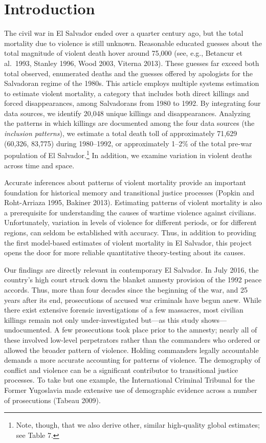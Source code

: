 \documentclass[11pt,]{article}
\let\rmarkdownfootnote\footnote%
\def\footnote{\protect\rmarkdownfootnote}
\begin{document}
\hypertarget{introduction}{%
\section{Introduction}\label{introduction}}

The civil war in El Salvador ended over a quarter century ago, but the
total mortality due to violence is still unknown. Reasonable educated
guesses about the total magnitude of violent death hover around 75,000
(see, e.g., Betancur et al.~1993, Stanley 1996, Wood 2003, Viterna
2013). These guesses far exceed both total observed, enumerated deaths
and the guesses offered by apologists for the Salvadoran regime of the
1980s. This article employs multiple systems estimation to estimate
violent mortality, a category that includes both direct killings and
forced disappearances, among Salvadorans from 1980 to 1992. By
integrating four data sources, we identify 20,048 unique killings and
disappearances. Analyzing the patterns in which killings are documented
among the four data sources (the \emph{inclusion patterns}), we estimate
a total death toll of approximately 71,629 (60,326, 83,775) during
1980--1992, or approximately 1--2\% of the total pre-war population of
El Salvador.\footnote{Note, though, that we also derive other, similar
  high-quality global estimates; see Table 7.} In addition, we examine
variation in violent deaths across time and space.

Accurate inferences about patterns of violent mortality provide an
important foundation for historical memory and transitional justice
processes (Popkin and Roht-Arriaza 1995, Bakiner 2013). Estimating
patterns of violent mortality is also a prerequisite for understanding
the causes of wartime violence against civilians. Unfortunately,
variation in levels of violence for different periods, or for different
regions, can seldom be established with accuracy. Thus, in addition to
providing the first model-based estimates of violent mortality in El
Salvador, this project opens the door for more reliable quantitative
theory-testing about its causes.

Our findings are directly relevant in contemporary El Salvador. In July
2016, the country's high court struck down the blanket amnesty provision
of the 1992 peace accords. Thus, more than four decades since the
beginning of the war, and 25 years after its end, prosecutions of
accused war criminals have begun anew. While there exist extensive
forensic investigations of a few massacres, most civilian killings
remain not only under-investigated but---as this study
shows---undocumented. A few prosecutions took place prior to the
amnesty; nearly all of these involved low-level perpetrators rather than
the commanders who ordered or allowed the broader pattern of violence.
Holding commanders legally accountable demands a more accurate
accounting for patterns of violence. The demography of conflict and
violence can be a significant contributor to transitional justice
processes. To take but one example, the International Criminal Tribunal
for the Former Yugoslavia made extensive use of demographic evidence
across a number of prosecutions (Tabeau 2009).
\end{document}
